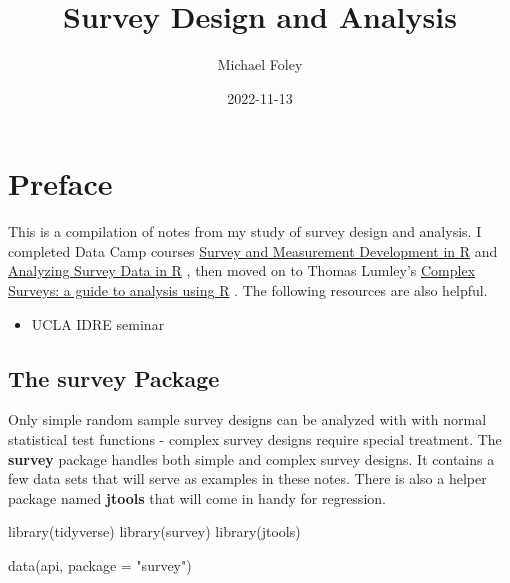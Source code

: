 \documentclass[
]{book}
\title{Survey Design and Analysis}
\author{Michael Foley}
\date{2022-11-13}
\newenvironment{Shaded}{\begin{snugshade}}{\end{snugshade}}
\newcommand{\AttributeTok}[1]{\textcolor[rgb]{0.77,0.63,0.00}{#1}}
\newcommand{\FunctionTok}[1]{\textcolor[rgb]{0.00,0.00,0.00}{#1}}
\newcommand{\NormalTok}[1]{#1}
\newcommand{\StringTok}[1]{\textcolor[rgb]{0.31,0.60,0.02}{#1}}
\providecommand{\tightlist}{%
  \setlength{\itemsep}{0pt}\setlength{\parskip}{0pt}}
\theoremstyle{definition}
\theoremstyle{definition}
\theoremstyle{definition}
\theoremstyle{definition}
\theoremstyle{remark}
\begin{document}
\maketitle

{
\setcounter{tocdepth}{1}
\tableofcontents
}
\hypertarget{preface}{%
\chapter*{Preface}\label{preface}}

This is a compilation of notes from my study of survey design and analysis. I completed Data Camp courses \href{https://app.datacamp.com/learn/courses/survey-and-measurement-development-in-r}{Survey and Measurement Development in R} \citep{mount} and \href{https://app.datacamp.com/learn/courses/analyzing-survey-data-in-r}{Analyzing Survey Data in R} \citep{mcconville}, then moved on to Thomas Lumley's \href{http://r-survey.r-forge.r-project.org/svybook/}{Complex Surveys: a guide to analysis using R} \citep{lumley2010}. The following resources are also helpful.

\begin{itemize}
\tightlist
\item
  UCLA IDRE seminar \citep{idre}
\end{itemize}

\hypertarget{the-survey-package}{%
\section*{The survey Package}\label{the-survey-package}}

Only simple random sample survey designs can be analyzed with with normal statistical test functions - complex survey designs require special treatment. The \textbf{survey} package \citep{R-survey} handles both simple and complex survey designs. It contains a few data sets that will serve as examples in these notes. There is also a helper package named \textbf{jtools} \citep{R-jtools} that will come in handy for regression.

\begin{Shaded}
\begin{Highlighting}[]
\FunctionTok{library}\NormalTok{(tidyverse)}
\FunctionTok{library}\NormalTok{(survey)}
\FunctionTok{library}\NormalTok{(jtools)}

\FunctionTok{data}\NormalTok{(api, }\AttributeTok{package =} \StringTok{"survey"}\NormalTok{)}
\end{Highlighting}
\end{Shaded}
\end{document}
